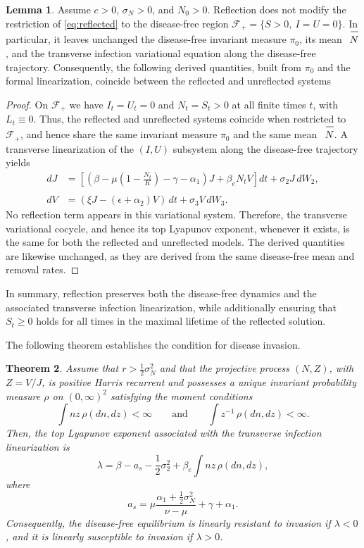 \documentclass[12pt,a4paper,reqno]{amsart}
\newtheorem{theorem}{Theorem}[section]
\theoremstyle{definition}
\newtheorem{lemma}[theorem]{Lemma}
\theoremstyle{remark}
\theoremstyle{plain}
\let\svoverline\overline
\newcommand{\uc}[1]{\mkern 5mu\svoverline{\mkern-1mu#1\mkern-0.3mu \rule{0pt}{3.5mm}}\mkern 0mu}
\let\overline\uc
\begin{document}
\begin{lemma}\label{cor:dfe-invariance}
Assume $c>0$, $\sigma_N>0$, and $N_0>0$. Reflection does not modify the restriction of \eqref{eq:reflected} to the disease-free region $\mathcal F_+=\{S>0,\ I=U=0\}$. In particular, it leaves unchanged the disease-free invariant measure $\pi_0$, its mean $\overline N$, and the transverse infection variational equation along the disease-free trajectory. Consequently, the following derived quantities, built from $\pi_0$ and the formal linearization, coincide between the reflected and unreflected systems
\end{lemma}
\begin{proof}
On $\mathcal F_+$ we have $I_t=U_t=0$ and $N_t=S_t>0$ at all finite times $t$, with $L_t\equiv0$. Thus, the reflected and unreflected systems coincide when restricted to $\mathcal F_+$, and hence share the same invariant measure $\pi_0$ and the same mean $\overline N$. A transverse linearization of the $(I,U)$ subsystem along the disease-free trajectory yields
\begin{align}\label{traverse}
dJ
&=
\left[
\left(
\beta-\mu\left(1-\frac{N_t}{K}\right)
-\gamma-\alpha_1
\right)J
+\beta_eN_tV
\right]dt
+\sigma_2J\,dW_2, \nonumber \\
& \\
dV
&=\left(\xi J-(\epsilon+\alpha_2)V \right)\,dt+\sigma_3V\,dW_3. \nonumber
\end{align}
No reflection term appears in this variational system. Therefore, the transverse variational cocycle, and hence its top Lyapunov exponent, whenever it exists, is the same for both the reflected and unreflected models. The derived quantities are likewise unchanged, as they are derived from the same disease-free mean and removal rates.
\end{proof}

In summary, reflection preserves both the disease-free dynamics and the associated transverse infection linearization, while additionally ensuring that $S_t\geq 0$ holds for all times in the maximal lifetime of the reflected solution. 

The following theorem establishes the condition for disease invasion.

\begin{theorem}\label{thm:main}
Assume that $r>\frac12\sigma_N^2$ and that the projective process $(N,Z)$, with $Z=V/J$, is positive Harris recurrent and possesses a unique invariant probability measure $\rho$ on $(0,\infty)^2$ satisfying the moment conditions
\begin{equation}\label{eq:rho-moments}
\int nz\,\rho(dn,dz)<\infty
\qquad\text{and}\qquad
\int z^{-1}\,\rho(dn,dz)<\infty.
\end{equation}
Then, the top Lyapunov exponent associated with the transverse infection linearization is
$$
\lambda
=
\beta-a_s-\frac12\sigma_2^2
+\beta_e\int nz\,\rho(dn,dz),
$$
where
$$a_s = \mu\frac{\alpha_1+\frac12\sigma_N^2}{\nu-\mu}+\gamma+\alpha_1.
$$
Consequently, the disease-free equilibrium is linearly resistant to invasion if $\lambda<0$, and it is linearly susceptible to invasion if $\lambda>0$.
\end{theorem}
\end{document}
